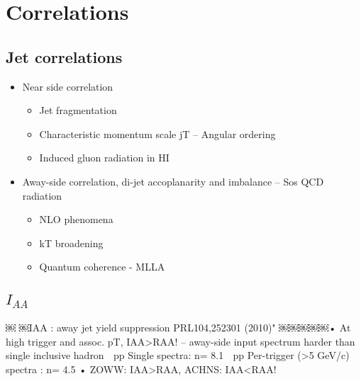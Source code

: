 
\section{Correlations}
\subsection{Jet correlations}
\begin{itemize}
\item Near side correlation
\begin{itemize}
\item Jet fragmentation
\item  Characteristic momentum scale jT –  Angular ordering
\item Induced gluon radiation in HI
\end{itemize}
\item Away-side correlation, di-jet accoplanarity and imbalance –  Sos QCD radiation
\begin{itemize}
\item NLO phenomena
\item kT broadening
\item  Quantum coherence - MLLA
\end{itemize}
\end{itemize}

\subsection{$I_{AA}$}
￼
￼IAA : away jet yield suppression PRL104,252301 (2010)"
￼￼￼￼￼• At high trigger and assoc. pT, IAA>RAA!
–  away-side input spectrum harder than single inclusive hadron
 pp Single spectra: n= 8.1  pp Per-trigger (>5 GeV/c) spectra : n= 4.5
• ZOWW: IAA>RAA, ACHNS: IAA<RAA!

